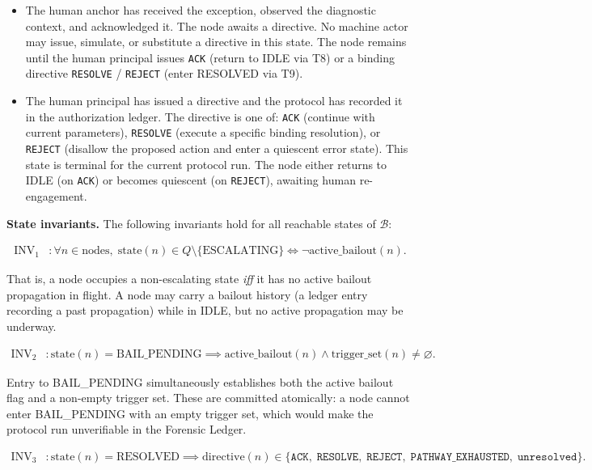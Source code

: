 \begin{itemize}
\item[\textbf{HUMAN\_ACKNOWLEDGED.}] The human anchor has received the exception, observed the diagnostic context, and acknowledged it. The node awaits a directive. No machine actor may issue, simulate, or substitute a directive in this state. The node remains until the human principal issues \texttt{ACK} (return to IDLE via T8) or a binding directive \texttt{RESOLVE} / \texttt{REJECT} (enter RESOLVED via T9).

\item[\textbf{RESOLVED.}] The human principal has issued a directive and the protocol has recorded it in the authorization ledger. The directive is one of: \texttt{ACK} (continue with current parameters), \texttt{RESOLVE} (execute a specific binding resolution), or \texttt{REJECT} (disallow the proposed action and enter a quiescent error state). This state is terminal for the current protocol run. The node either returns to IDLE (on \texttt{ACK}) or becomes quiescent (on \texttt{REJECT}), awaiting human re-engagement.
\end{itemize}

\bigskip
\noindent\textbf{State invariants.} The following invariants hold for all reachable states of $\mathcal{B}$:

\begin{align}
\text{INV}_1 &: \forall n \in \text{nodes},\; \text{state}(n) \in Q \setminus \{\text{ESCALATING}\} \iff \neg\text{active\_bailout}(n). \tag{INV-1}
\end{align}

That is, a node occupies a non-escalating state \emph{iff} it has no active bailout propagation in flight. A node may carry a bailout history (a ledger entry recording a past propagation) while in IDLE, but no active propagation may be underway.

\begin{align}
\text{INV}_2 &: \text{state}(n) = \text{BAIL\_PENDING} \implies \text{active\_bailout}(n) \land \text{trigger\_set}(n) \neq \varnothing. \tag{INV-2}
\end{align}

Entry to BAIL\_PENDING simultaneously establishes both the active bailout flag and a non-empty trigger set. These are committed atomically: a node cannot enter BAIL\_PENDING with an empty trigger set, which would make the protocol run unverifiable in the Forensic Ledger.

\begin{align}
\text{INV}_3 &: \text{state}(n) = \text{RESOLVED} \implies \text{directive}(n) \in \{\texttt{ACK},\; \texttt{RESOLVE},\; \texttt{REJECT},\; \texttt{PATHWAY\_EXHAUSTED},\; \texttt{unresolved}\}. \tag{INV-3}
\end{align}

